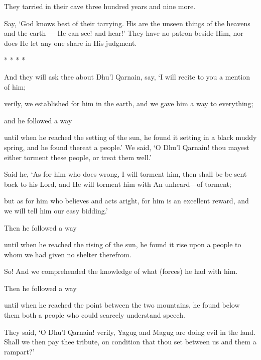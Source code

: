 \documentclass[fontsize=14pt, letterpaper, notitlepage, openany, DIV=12]{scrbook} %
\begin{document}
\noindent[18:25]
They tarried in their cave three hundred years and nine more.

\noindent[18:26]
Say, `God knows best of their tarrying. His are the unseen things of the heavens and the
earth --- He can see! and hear!' They have no patron beside Him, nor does He let any one share
in His judgment.

\begin{center}
  {\Huge
    *
    \hspace{2em}
    *
    \hspace{2em}
    *
    \hspace{2em}
    *
  }
\end{center}

\noindent[18:83]
And they will ask thee about Dhu'l Qarnain, say, `I will recite to you a mention of him;

\noindent[18:84]
verily, we established for him in the earth, and we gave him a way to everything;

\noindent[18:85]
and he followed a way

\noindent[18:86]
until when he reached the setting of the sun, he found it setting in a black muddy spring,
and he found thereat a people.' We said, `O Dhu'l Qarnain! thou mayest either torment these
people, or treat them well.'

\noindent[18:87]
Said he, `As for him who does wrong, I will torment him, then shall be be sent back to his
Lord, and He will torment him with An unheard---of torment;

\noindent[18:88]
but as for him who believes and acts aright, for him is an excellent reward, and we will
tell him our easy bidding.'

\noindent[18:89]
Then he followed a way

\noindent[18:90]
until when he reached the rising of the sun, he found it rise upon a people to whom we
had given no shelter therefrom.

\noindent[18:91]
So! And we comprehended the knowledge of what (forces) he had with him.

\noindent[18:92]
Then he followed a way

\noindent[18:93]
until when he reached the point between the two mountains, he found below them both a
people who could scarcely understand speech.

\noindent[18:94]
They said, `O Dhu'l Qarnain! verily, Yagug and Magug are doing evil in the land. Shall
we then pay thee tribute, on condition that thou set between us and them a rampart?'
\end{document}
